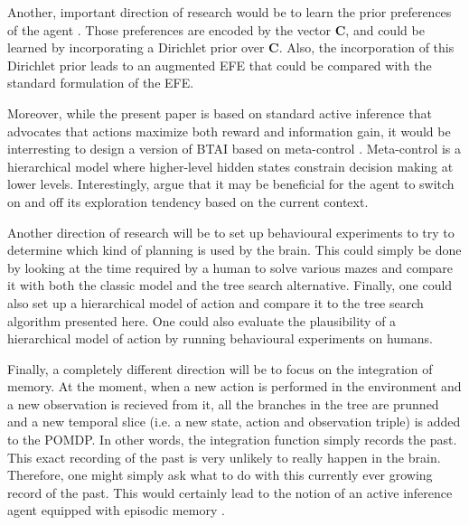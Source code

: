 \documentclass[twoside,11pt]{article}
\begin{document}
Another, important direction of research would be to learn the prior preferences of the agent \citep{sajid2021exploration}. Those preferences are encoded by the vector $\bm{C}$, and could be learned by incorporating a Dirichlet prior over $\bm{C}$. Also, the incorporation of this Dirichlet prior leads to an augmented EFE that could be compared with the standard formulation of the EFE.

Moreover, while the present paper is based on standard active inference that advocates that actions maximize both reward and information gain, it would be interresting to design a version of BTAI based on meta-control \citep{Markovic2021}. Meta-control is a hierarchical model where higher-level hidden states constrain decision making at lower levels. Interestingly, \citet{Markovic2021} argue that it may be beneficial for the agent to switch on and off its exploration tendency based on the current context.

Another direction of research will be to set up behavioural experiments to try to determine which kind of planning is used by the brain. This could simply be done by looking at the time required by a human to solve various mazes and compare it with both the classic model and the tree search alternative. Finally, one could also set up a hierarchical model of action and compare it to the tree search algorithm presented here. One could also evaluate the plausibility of a hierarchical model of action by running behavioural experiments on humans.

Finally, a completely different direction will be to focus on the integration of memory. At the moment, when a new action is performed in the environment and a new observation is recieved from it, all the branches in the tree are prunned and a new temporal slice (i.e. a new state, action and observation triple) is added to the POMDP. In other words, the integration function simply records the past. This exact recording of the past is very unlikely to really happen in the brain. Therefore, one might simply ask what to do with this currently ever growing record of the past. This would certainly lead to the notion of an active inference agent equipped with episodic memory \citep{BOTVINICK2019408}.


\end{document}
